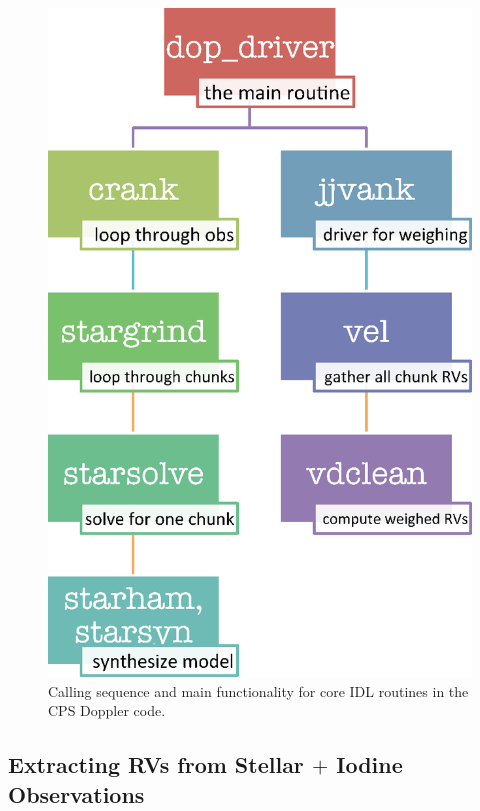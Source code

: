 \begin{figure}
  \centering
\includegraphics[scale=0.6]{doppler/flowchart.eps}
\caption{Calling sequence and main functionality for core IDL
  routines in the CPS Doppler code. \label{doppler:fig:flowchart}}
\end{figure}


\subsection{Extracting RVs from Stellar $+$ Iodine Observations}

